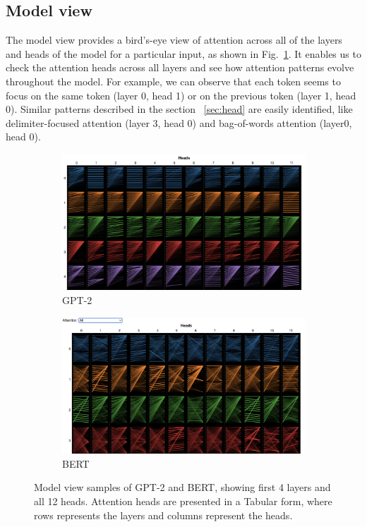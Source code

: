 \documentclass[]{article}
\begin{document}
\subsection{Model view}
\label{sec:model}
The model view provides a bird's-eye view of attention across all of the layers and heads of the model for a particular input, as shown in Fig.~\ref{fig:model_view}.
It enables us to check the attention heads across all layers and see how attention patterns evolve throughout the model. 
For example, we can observe that each token seems to focus on the same token (layer 0, head 1) or on the previous token (layer 1, head 0).
Similar patterns described in the section ~\ref{sec:head} are easily identified, like delimiter-focused attention (layer 3, head 0) and bag-of-words attention (layer0, head 0). 

\begin{figure}[!h]
    \centering
    \begin{subfigure}[b]{0.8\textwidth}
        \includegraphics[width=\textwidth]{FIGS/gpt2_model.png}
        \caption{GPT-2}
    \end{subfigure} 
    \hfill
    \begin{subfigure}[b]{0.8\textwidth}
        \includegraphics[width=\textwidth]{FIGS/bert_model.png}
        \caption{BERT}
    \end{subfigure}
    \vfill
    \caption{Model view samples of GPT-2 and BERT, showing first 4 layers and all 12 heads. Attention heads are presented in a Tabular form, where rows represents the layers and columns represent the heads.}
    \label{fig:model_view}
\end{figure}
\end{document}
